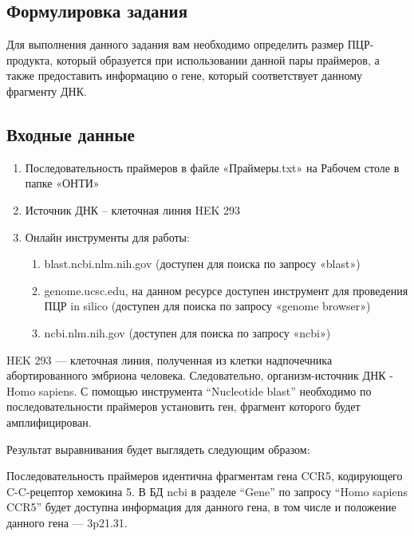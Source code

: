 
\subsection*{Формулировка задания}
Для выполнения данного задания вам необходимо определить размер ПЦР-продукта, который образуется при использовании данной пары праймеров, а также предоставить информацию о гене, который соответствует данному фрагменту ДНК.

\subsection*{Входные данные}

\begin{enumerate}
\item Последовательность праймеров в файле «Праймеры.txt» на Рабочем столе в папке «ОНТИ»

\item Источник ДНК – клеточная линия HEK 293
\item Онлайн инструменты для работы:

\begin{enumerate}

\item blast.ncbi.nlm.nih.gov (доступен для поиска по запросу «blast»)
\item genome.ucsc.edu, на данном ресурсе доступен инструмент для проведения ПЦР in silico (доступен для поиска по запросу «genome browser»)
\item ncbi.nlm.nih.gov (доступен для поиска по запросу «ncbi»)
\end{enumerate}

\end{enumerate}

\solutionSection

HEK 293 — клеточная линия, полученная из клетки надпочечника абортированного эмбриона человека. Следовательно, организм-источник ДНК - Homo sapiens.
С помощью инструмента “Nucleotide blast” необходимо по последовательности праймеров установить ген, фрагмент которого будет амплифицирован.


Результат выравнивания будет выглядеть следующим образом:


Последовательность праймеров идентична фрагментам гена CCR5, кодирующего  C-C-рецептор хемокина 5.
В БД ncbi в разделе “Gene” по запросу “Homo sapiens CCR5” будет доступна информация для данного гена, в том числе и положение данного гена — 3p21.31.

